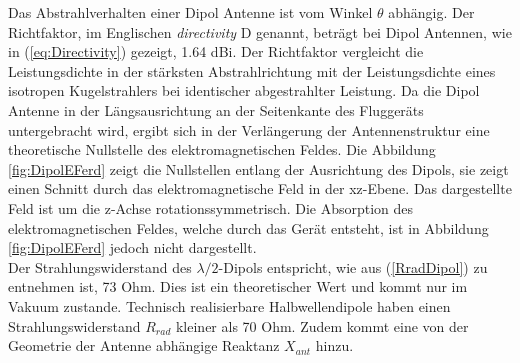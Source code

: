 Das Abstrahlverhalten einer Dipol Antenne ist vom Winkel $\theta$ abhängig. Der Richtfaktor, im Englischen \textit{directivity} D genannt, beträgt bei Dipol Antennen, wie in (\ref{eq:Directivity}) gezeigt, 1.64 dBi. Der Richtfaktor vergleicht die Leistungsdichte in der stärksten Abstrahlrichtung mit der Leistungsdichte eines isotropen Kugelstrahlers bei identischer abgestrahlter Leistung. Da die Dipol Antenne in der Längsausrichtung an der Seitenkante des Fluggeräts untergebracht wird, ergibt sich in der Verlängerung der Antennenstruktur eine theoretische Nullstelle des elektromagnetischen Feldes. Die Abbildung \ref{fig:DipolEFerd} zeigt die Nullstellen entlang der Ausrichtung des Dipols, sie zeigt einen Schnitt durch das elektromagnetische Feld in der xz-Ebene. Das dargestellte Feld ist um die z-Achse rotationssymmetrisch. Die Absorption des elektromagnetischen Feldes, welche durch das Gerät entsteht, ist in Abbildung \ref{fig:DipolEFerd} jedoch nicht dargestellt.\\
Der Strahlungswiderstand des $\lambda/2$-Dipols entspricht, wie aus (\ref{RradDipol}) zu entnehmen ist, 73 Ohm. Dies ist ein theoretischer Wert und kommt nur im Vakuum zustande. Technisch realisierbare Halbwellendipole haben einen Strahlungswiderstand $R_{rad}$ kleiner als 70 Ohm. Zudem kommt eine von der Geometrie der Antenne abhängige Reaktanz $X_{ant}$ hinzu.

